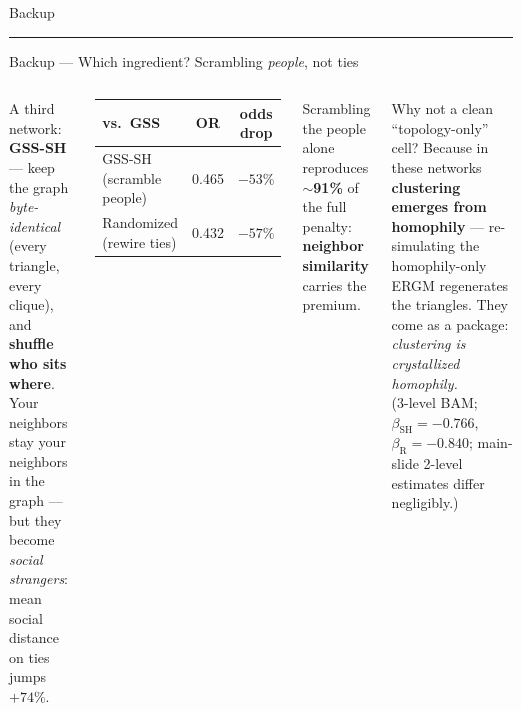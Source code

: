 \documentclass[aspectratio=169,11pt]{beamer}
\newcommand{\emphr}[1]{{\color{ndreddark}\textbf{#1}}}
\newcommand{\sectionslide}[1]{%
  \begin{frame}[plain]
    \vfill
    \begin{center}
      {\Large #1}\\[2pt]
      {\color{ndred}\rule{0.30\textwidth}{1.1pt}}
    \end{center}
    \vfill
  \end{frame}}
\begin{document}
\sectionslide{Backup}

\begin{frame}{Backup — Which ingredient? Scrambling \emph{people}, not ties}
\begin{columns}[c]
\small
A third network: \emphr{GSS-SH} — keep the graph \emph{byte-identical} (every
triangle, every clique), and \emphr{shuffle who sits where}.\\[4pt]
Your neighbors stay your neighbors in the graph — but they become
\emph{social strangers}: mean social distance on ties jumps $+74\%$.
\vspace{0.3cm}
\begin{center}
\renewcommand{\arraystretch}{1.4}
{\small
\begin{tabular}{@{}lcc@{}}
\toprule
\textbf{vs.\ GSS} & OR & odds drop \\
\midrule
\rowcolor{ndblue!12} GSS-SH (scramble people) & 0.465 & \emphr{$-53\%$} \\
\rowcolor{ndgreen!12} Randomized (rewire ties) & 0.432 & \emphr{$-57\%$} \\
\bottomrule
\end{tabular}}
\end{center}
\small
Scrambling the people alone reproduces \emphr{$\sim$91\%} of the full penalty:
\emphr{neighbor similarity} carries the premium.
\vspace{0.3cm}

Why not a clean ``topology-only'' cell? Because in these networks
\emphr{clustering emerges from homophily} — re-simulating the homophily-only
ERGM regenerates the triangles. They come as a package:
\emph{clustering is crystallized homophily.}
\\[6pt]
{\scriptsize (3-level BAM; $\beta_{\text{SH}}=-0.766$, $\beta_{\text{R}}=-0.840$;
main-slide 2-level estimates differ negligibly.)}
\end{columns}
\end{frame}
\end{document}
